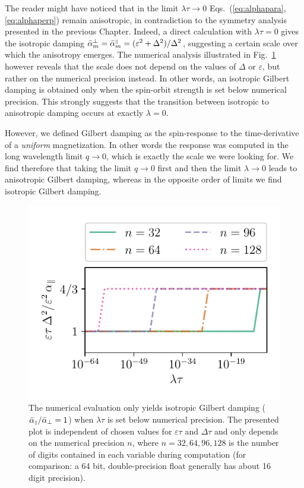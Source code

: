 The reader might have noticed that in the limit $\lambda\tau\rightarrow0$ Eqs.~(\ref{eq:alphapara},\ref{eq:alphaperp}) remain anisotropic, in contradiction to the symmetry analysis presented in the previous Chapter. Indeed, a direct calculation with $\lambda\tau=0$ gives the isotropic damping $\bar{\alpha}_m^{\perp}=\bar{\alpha}_m^{{\scriptscriptstyle\parallel}}=(\varepsilon^2+\Delta^2)/\Delta^2$, suggesting a certain scale over which the anisotropy emerges. The numerical analysis illustrated in Fig.~\ref{fig:num_test} however reveals that the scale does not depend on the values of $\Delta$ or $\varepsilon$, but rather on the numerical precision instead. In other words, an isotropic Gilbert damping is obtained only when the spin-orbit strength is set below numerical precision. This strongly suggests that the transition between isotropic to anisotropic damping occurs at exactly $\lambda=0$. 

However, we defined Gilbert damping as the spin-response to the time-derivative of a \emph{uniform} magnetization. In other words the response was computed in the long wavelength limit $q\rightarrow0$, which is exactly the scale we were looking for. We find therefore that taking the limit $q\rightarrow0$ first and then the limit $\lambda\rightarrow0$ leads to anisotropic Gilbert damping, whereas in the opposite order of limits we find isotropic Gilbert damping.  

\begin{figure}
    \centering
    \includegraphics[width=0.75\linewidth]{gfx/numerical_test}
    \caption{The numerical evaluation only yields isotropic Gilbert damping ($\bar{\alpha}_{{\scriptscriptstyle\parallel}}/\bar{\alpha}_{\perp}=1$) when $\lambda\tau$ is set below numerical precision. The presented plot is independent of chosen values for $\varepsilon\tau$ and $\Delta\tau$ and only depends on the numerical precision $n$, where $n=32,64,96,128$ is the number of digits contained in each variable during computation (for comparison: a 64 bit, double-precision float generally has about 16 digit precision). }
    \label{fig:num_test}
\end{figure}


